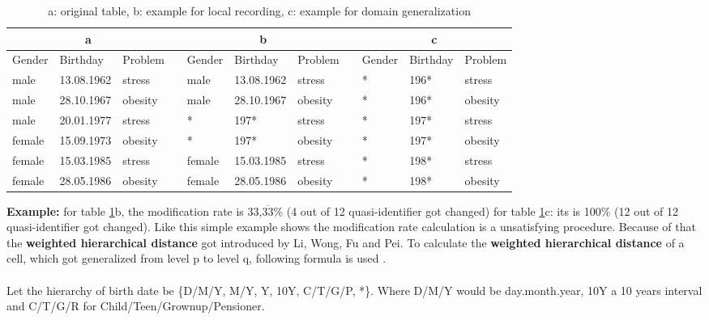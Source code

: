 \documentclass{llncs}
\begin{document}
	
\begin{table}[]
	\centering
	\caption{a: original table, b: example for local recording, c: example for domain generalization }
	\label{table_distortion}
	\begin{tabular}{@{}lllllllllll@{}}
		\multicolumn{3}{c}{\textbf{a}} &           & \multicolumn{3}{c}{\textbf{b}} &  & \multicolumn{3}{c}{\textbf{c}} \\ \midrule
		Gender  & Birthday   & Problem & \textbf{} & Gender  & Birthday   & Problem &  & Gender  & Birthday  & Problem  \\ \midrule
		male    & 13.08.1962 & stress  &           & male    & 13.08.1962 & stress  &  & *       & 196*      & stress   \\
		male    & 28.10.1967 & obesity &           & male    & 28.10.1967 & obesity &  & *       & 196*      & obesity  \\
		male    & 20.01.1977 & stress  &           & *       & 197*       & stress  &  & *       & 197*      & stress   \\
		female  & 15.09.1973 & obesity &           & *       & 197*       & obesity &  & *       & 197*      & obesity  \\
		female  & 15.03.1985 & stress  &           & female  & 15.03.1985 & stress  &  & *       & 198*      & stress   \\
		female  & 28.05.1986 & obesity &           & female  & 28.05.1986 & obesity &  & *       & 198*      & obesity  \\ \bottomrule
	\end{tabular}
\end{table}

\textbf{Example:} for table \ref{table_distortion}b, the modification rate is  33,$\overline{33}$\% (4 out of 12 quasi-identifier got changed) for table \ref{table_distortion}c: its is 100\% (12 out of 12 quasi-identifier got changed). Like this simple example shows the modification rate calculation is a unsatisfying procedure. Because of that the \textbf{weighted hierarchical distance} got introduced by Li, Wong, Fu and Pei. 
To calculate the \textbf{weighted hierarchical distance} of a cell, which got generalized from level p to level q, following formula is used \cite{li2006achieving}.\\
\cite{li2006achieving}\\
Let the hierarchy of birth date be \{D/M/Y, M/Y, Y, 10Y, C/T/G/P, *\}. Where D/M/Y  would be day.month.year, 10Y a 10 years interval and C/T/G/R for Child/Teen/Grownup/Pensioner.\\
\end{document}
